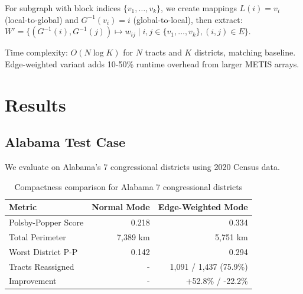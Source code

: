 \documentclass[11pt,twocolumn]{article}
\begin{document}
For subgraph with block indices $\{v_1, \ldots, v_k\}$, we create mappings $L(i) = v_i$ (local-to-global) and $G^{-1}(v_i) = i$ (global-to-local), then extract: $W' = \{(G^{-1}(i), G^{-1}(j)) \mapsto w_{ij} \mid i,j \in \{v_1, \ldots, v_k\}, (i,j) \in E\}$.

Time complexity: $O(N \log K)$ for $N$ tracts and $K$ districts, matching baseline. Edge-weighted variant adds 10-50\% runtime overhead from larger METIS arrays.

\section{Results}

\subsection{Alabama Test Case}

We evaluate on Alabama's 7 congressional districts using 2020 Census data.

\begin{table}[h]
\centering
\begin{tabular}{lrr}
\toprule
Metric & Normal Mode & Edge-Weighted Mode \\
\midrule
Polsby-Popper Score & 0.218 & 0.334 \\
Total Perimeter & 7,389 km & 5,751 km \\
Worst District P-P & 0.142 & 0.294 \\
Tracts Reassigned & - & 1,091 / 1,437 (75.9\%) \\
\midrule
Improvement & - & +52.8\% / -22.2\% \\
\bottomrule
\end{tabular}
\caption{Compactness comparison for Alabama 7 congressional districts}
\end{table}
\end{document}
